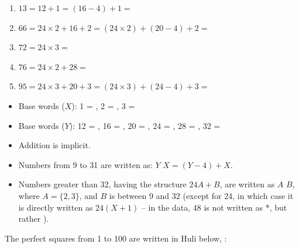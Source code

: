 \begin{refsection}
\begin{mysolution}
\begin{solutions}[resume]
    \item 
    \begin{enumerate}[noitemsep,leftmargin=0pt]
    \item[] $13 = 12 + 1 = (16-4) + 1 =$ 
    \item[] $66 = 24\times2 + 16 + 2 = (24\times2) + (20-4) + 2 =$ 
    \item[] $72 = 24\times3 =$ 
    \item[] $76 = 24\times2 + 28 =$ 
    \item[] $95 = 24\times3 + 20 + 3 = (24\times3) + (24-4) + 3 =$ 
    \end{enumerate}
\end{solutions}


\begin{itemize}
    \item Base words ($X$): 1 = , 2 = , 3 = 
    \item Base words ($Y$): 12 = , 16 = , 20 = , 24 = , 28 = , 32 = 
    \item Addition is implicit.
    \item Numbers from 9 to 31 are written as: $Y$ $X = (Y-4) + X$.
    \item Numbers greater than 32, having the structure $24A + B$, are written as  $A$ $B$, where $A = \{2, 3\}$, and $B$ is between 9 and 32 (except for 24, in which case it is directly written as $24(X+1)$ – in the data, 48 is not written as *, but rather ).
\end{itemize}
\end{mysolution}

\begin{problem}{\langnameHuli}{\nameBHuang}{}
The perfect squares from 1 to 100 are written in Huli below, \OlympiadRandomOrder{}:


\end{problem}
\end{refsection}
